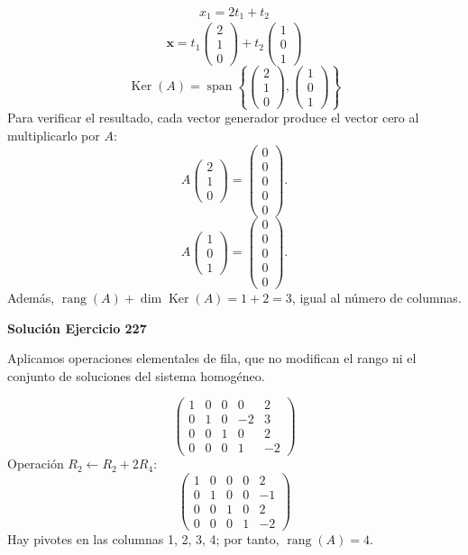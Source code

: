 \documentclass[12pt]{article}
\newcommand{\rang}{\operatorname{rang}}
\newcommand{\Ker}{\operatorname{Ker}}
\newcommand{\vect}[1]{\boldsymbol{#1}}
\begin{document}
\[
\begin{aligned}x_{1}=2 t_{1} + t_{2}\end{aligned}
\]
\[
\vect x=t_{1}\begin{pmatrix}2\\1\\0\end{pmatrix} + t_{2}\begin{pmatrix}1\\0\\1\end{pmatrix}
\]
\[
\boxed{\Ker(A)=\operatorname{span}\left\{\begin{pmatrix}2\\1\\0\end{pmatrix},\begin{pmatrix}1\\0\\1\end{pmatrix}\right\}}
\]
Para verificar el resultado, cada vector generador produce el vector cero al multiplicarlo por $A$:
\[
A\begin{pmatrix}2\\1\\0\end{pmatrix}=\begin{pmatrix}0\\0\\0\\0\\0\end{pmatrix}.
\]
\[
A\begin{pmatrix}1\\0\\1\end{pmatrix}=\begin{pmatrix}0\\0\\0\\0\\0\end{pmatrix}.
\]
Además, $\rang(A)+\dim\Ker(A)=1+2=3$, igual al número de columnas.


\par\bigskip\noindent\textbf{Solución Ejercicio 227}\par\nobreak
Aplicamos operaciones elementales de fila, que no modifican el rango ni el conjunto de soluciones del sistema homogéneo.

\[
\begin{pmatrix}1&0&0&0&2\\0&1&0&-2&3\\0&0&1&0&2\\0&0&0&1&-2\end{pmatrix}
\]
Operación $R_{2}\leftarrow R_{2}+2R_{4}$:
\[
\begin{pmatrix}1&0&0&0&2\\0&1&0&0&-1\\0&0&1&0&2\\0&0&0&1&-2\end{pmatrix}
\]
Hay pivotes en las columnas 1, 2, 3, 4; por tanto, $\boxed{\rang(A)=4}$.
\end{document}

